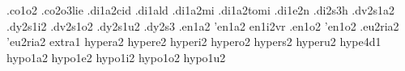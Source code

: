{.co1o2                                                                          
.co2o3lie                                                                       
.di1a2cid                                                                       
.di1ald                                                                         
.di1a2mi                                                                        
.di1a2tomi                                                                      
.di1e2n                                                                         
.di2s3h                                                                         
.dv2s1a2                                                                        
.dy2s1i2                                                                        
.dv2s1o2                                                                        
.dy2s1u2                                                                        
.dy2s3                                                                          
.en1a2                                                                          
'en1a2                                                                          
en1i2vr                                                                         
.en1o2                                                                          
'en1o2                                                                          
.eu2ria2                                                                        
'eu2ria2                                                                        
extra1                                                                          
hypera2                                                                         
hypere2                                                                         
hyperi2                                                                         
hypero2                                                                         
hypers2                                                                         
hyperu2                                                                         
hype4d1                                                                         
hypo1a2                                                                         
hypo1e2                                                                         
hypo1i2                                                                         
hypo1o2                                                                         
hypo1u2                                                                         
}
